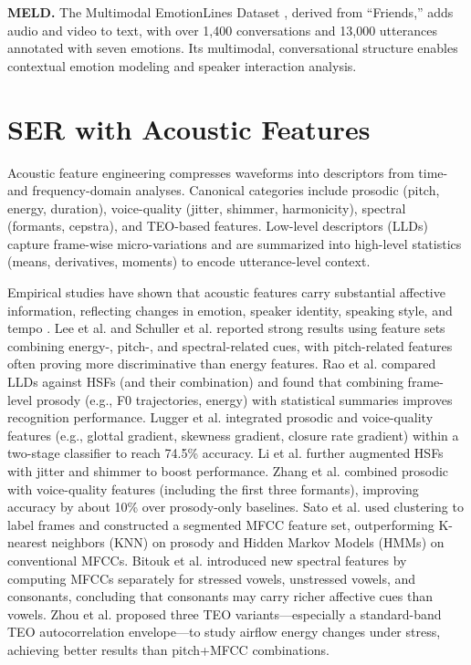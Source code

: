 \textbf{MELD.} The Multimodal EmotionLines Dataset \cite{poria2018meld}, derived from “Friends,” adds audio and video to text, with over 1,400 conversations and 13,000 utterances annotated with seven emotions. Its multimodal, conversational structure enables contextual emotion modeling and speaker interaction analysis.

\section{SER with Acoustic Features}
Acoustic feature engineering compresses waveforms into descriptors from time- and frequency-domain analyses. Canonical categories include prosodic (pitch, energy, duration), voice-quality (jitter, shimmer, harmonicity), spectral (formants, cepstra), and TEO-based features. Low-level descriptors (LLDs) capture frame-wise micro-variations and are summarized into high-level statistics (means, derivatives, moments) to encode utterance-level context.

Empirical studies have shown that acoustic features carry substantial affective information, reflecting changes in emotion, speaker identity, speaking style, and tempo \cite{liu2014multimodal}.
 Lee et al.  \cite{lee2002combining} and Schuller et al. \cite{schuller2004speech}  reported strong results using feature sets combining energy-, pitch-, and spectral-related cues, with pitch-related features often proving more discriminative than energy features.
 Rao et al. \cite{rao2013emotion} compared LLDs  against HSFs (and their combination) and found that combining frame-level prosody (e.g., F0 trajectories, energy) with statistical summaries improves recognition performance. Lugger et al.  integrated prosodic and voice-quality features (e.g., glottal gradient, skewness gradient, closure rate gradient) within a two-stage classifier to reach 74.5\% accuracy.
 Li et al. \cite{li2007stress} further augmented HSFs with jitter and shimmer to boost performance.
 Zhang et al. \cite{zhang2016mechanics} combined prosodic with voice-quality features (including the first three formants), improving accuracy by about 10\% over prosody-only baselines.
 Sato et al. \cite{sato2007emotion} used clustering to label frames and constructed a segmented MFCC feature set, outperforming K-nearest neighbors (KNN) on prosody and Hidden Markov Models (HMMs) on conventional MFCCs.
 Bitouk et al. \cite{bitouk2010class} introduced new spectral features by computing MFCCs separately for stressed vowels, unstressed vowels, and consonants, concluding that consonants may carry richer affective cues than vowels.
Zhou et al. \cite{zhou2002nonlinear} proposed three TEO variants—especially a standard-band TEO autocorrelation envelope—to study airflow energy changes under stress, achieving better results than pitch+MFCC combinations.

